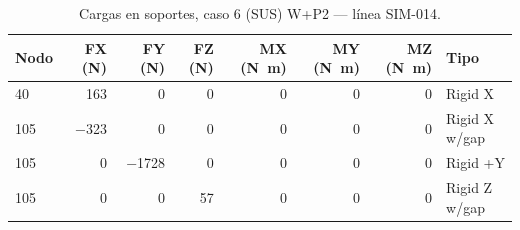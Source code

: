 \begin{table}[htbp]
  \centering
  \footnotesize
  \caption{Cargas en soportes, caso 6 (SUS) W+P2 — línea SIM-014.}
  \label{tab:restricciones-sus}
  \begin{tabular}{lrrrrrrl}
    \toprule
    Nodo & FX (\si{N}) & FY (\si{N}) & FZ (\si{N}) & MX (\si{N.m}) & MY (\si{N.m}) & MZ (\si{N.m}) & Tipo \\
    \midrule
    40 & \num{163} & \num{0} & \num{0} & \num{0} & \num{0} & \num{0} & Rigid X \\
    105 & \num{-323} & \num{0} & \num{0} & \num{0} & \num{0} & \num{0} & Rigid X w/gap \\
    105 & \num{0} & \num{-1728} & \num{0} & \num{0} & \num{0} & \num{0} & Rigid +Y \\
    105 & \num{0} & \num{0} & \num{57} & \num{0} & \num{0} & \num{0} & Rigid Z w/gap \\
    \bottomrule
  \end{tabular}
\end{table}
